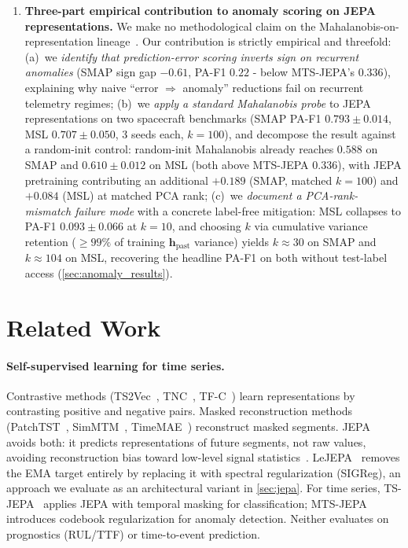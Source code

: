 \documentclass{article}
\newcommand{\h}{\mathbf{h}}
\begin{document}
\begin{enumerate}[nosep]
  \item \textbf{Three-part empirical contribution to anomaly scoring on JEPA representations.} We make no methodological claim on the Mahalanobis-on-representation lineage~\citep{lee2018mahalanobis,sehwag2021ssd,ren2021simple}. Our contribution is strictly empirical and threefold: (a)~we \emph{identify that prediction-error scoring inverts sign on recurrent anomalies} (SMAP sign gap $-0.61$, PA-F1 $0.22$ - below MTS-JEPA's $0.336$), explaining why naive ``error $\Rightarrow$ anomaly'' reductions fail on recurrent telemetry regimes; (b)~we \emph{apply a standard Mahalanobis probe} to JEPA representations on two spacecraft benchmarks (SMAP PA-F1 $\mathbf{0.793 \pm 0.014}$, MSL $\mathbf{0.707 \pm 0.050}$, 3 seeds each, $k=100$), and decompose the result against a random-init control: random-init Mahalanobis already reaches $0.588$ on SMAP and $0.610 \pm 0.012$ on MSL (both above MTS-JEPA $0.336$), with JEPA pretraining contributing an additional $+0.189$ (SMAP, matched $k{=}100$) and $+0.084$ (MSL) at matched PCA rank; (c)~we \emph{document a PCA-rank-mismatch failure mode} with a concrete label-free mitigation: MSL collapses to PA-F1 $0.093 \pm 0.066$ at $k=10$, and choosing $k$ via cumulative variance retention ($\geq 99\%$ of training $\h_\text{past}$ variance) yields $k \approx 30$ on SMAP and $k \approx 104$ on MSL, recovering the headline PA-F1 on both without test-label access (\cref{sec:anomaly_results}).
\end{enumerate}

\section{Related Work}
\label{sec:related}

\paragraph{Self-supervised learning for time series.}
Contrastive methods (TS2Vec~\citep{yue2022ts2vec}, TNC~\citep{tonekaboni2021tnc}, TF-C~\citep{zhang2022tfc}) learn representations by contrasting positive and negative pairs.
Masked reconstruction methods (PatchTST~\citep{nie2023patchtst}, SimMTM~\citep{dong2023simmtm}, TimeMAE~\citep{cheng2023timemae}) reconstruct masked segments.
JEPA avoids both: it predicts representations of future segments, not raw values, avoiding reconstruction bias toward low-level signal statistics~\citep{assran2023ijepa,bardes2024vjepa}. LeJEPA~\citep{balestriero2025lejepa} removes the EMA target entirely by replacing it with spectral regularization (SIGReg), an approach we evaluate as an architectural variant in \cref{sec:jepa}.
For time series, TS-JEPA~\citep{tsjepa2024} applies JEPA with temporal masking for classification; MTS-JEPA~\citep{mtsjepa2026} introduces codebook regularization for anomaly detection. Neither evaluates on prognostics (RUL/TTF) or time-to-event prediction.
\end{document}
